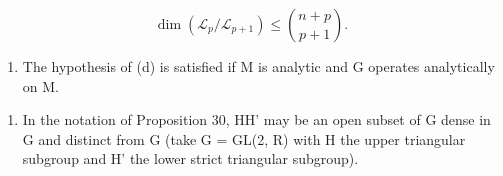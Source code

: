 \[
\dim (\mathcal {L} _ {p} / \mathcal {L} _ {p + 1}) \leqslant \binom {n + p} {p + 1}.
\]

\begin{enumerate}
\def\labelenumi{(\alph{enumi})}
\setcounter{enumi}{4}
\tightlist
\item
  The hypothesis of (d) is satisfied if M is analytic and G operates analytically on M.
\end{enumerate}

\begin{enumerate}
\def\labelenumi{\arabic{enumi}.}
\setcounter{enumi}{8}
\tightlist
\item
  In the notation of Proposition 30, HH' may be an open subset of G dense in G and distinct from G (take G = GL(2, R) with H the upper triangular subgroup and H' the lower strict triangular subgroup).
\end{enumerate}

